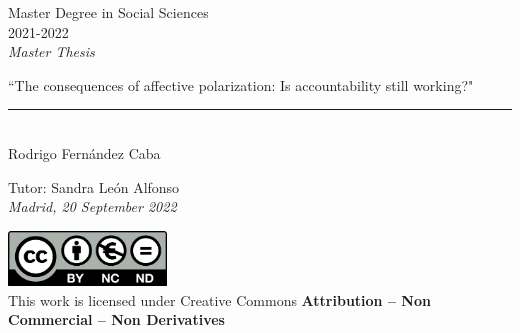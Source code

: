 \documentclass[a4paper, svgnames]{article}
\begin{document}

\begin{titlepage}
	\begin{sffamily}
		\color{azulUC3M}
		\begin{center}
			\begin{figure}[H] %
			\end{figure}
			\vspace{2.5cm}
			\begin{Large}
				Master Degree in Social Sciences\\
				2021-2022\\ %
				\vspace{2cm}
				\textsl{Master Thesis}
				\bigskip

			\end{Large}
			\renewcommand{\baselinestretch}{1.5}
			{\Huge ``The consequences of affective polarization: Is accountability still working?"\par}
			\renewcommand{\baselinestretch}{1.15}
			\vspace*{0.5cm}
			\rule{10.5cm}{0.1mm}\\
			\vspace*{0.9cm}
			{\huge Rodrigo Fernández Caba}\\
			\vspace*{1cm}
			\begin{LARGE}
				Tutor: Sandra León Alfonso\\
				\textit{Madrid, 20 September 2022}\\
			\end{LARGE}
		\end{center}
		\vfill
		\color{black}
		\noindent\includegraphics[width=4.2cm]{creativecommons.png}\\ %
		\footnotesize{This work is licensed under Creative Commons \textbf{Attribution – Non Commercial – Non Derivatives}}

	\end{sffamily}
\end{titlepage}
\end{document}
